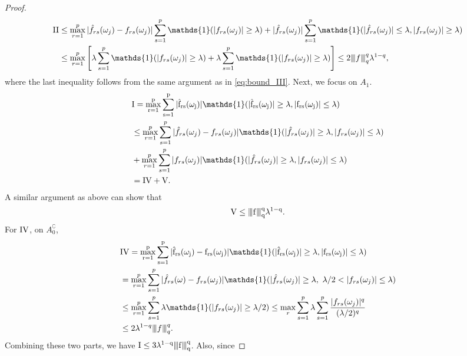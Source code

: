\begin{proof}
\begin{equation*}
\begin{aligned}
\rm{II} &\le \max_{r=1}^p |\hat{f}_{rs}(\omega_j)-f_{rs}(\omega_j)|\sum_{s=1}^p\mathds{1}(|f_{rs}(\omega_j)|\ge \lambda)+|\hat{f}_{rs}(\omega_j)|\sum_{s=1}^p \mathds{1}(|\hat{f}_{rs}(\omega_j)|\le \lambda, |f_{rs}(\omega_j)|\ge \lambda)\\
& \le \max_{r=1}^p \left[\lambda \sum_{s=1}^p\mathds{1}(|f_{rs}(\omega_j)|\ge \lambda)+\lambda  \sum_{s=1}^p \mathds{1}(|f_{rs}(\omega_j)|\ge \lambda)\right]\le 2\vertiii{f}_q^q \lambda^{1-q},
\end{aligned}
\end{equation*}
where the last inequality follows from the same argument as in \eqref{eq:bound_III}. Next, we focus on $A_1$. 
\begin{equation*}
\begin{aligned}
&\rm{I} = \max_{r=1}^p \sum_{s=1}^p |\hat{f}_{rs}(\omega_j)|\mathds{1}(|\hat{f}_{rs}(\omega_j)|\ge \lambda, |f_{rs}(\omega_j)|\le \lambda)\\
& \le \max_{r=1}^p \sum_{s=1}^p |\hat{f}_{rs}(\omega_j)-f_{rs}(\omega_j)|\mathds{1}(|\hat{f}_{rs}(\omega_j)|\ge \lambda, |f_{rs}(\omega_j)|\le \lambda)\\
&+\max_{r=1}^p \sum_{s=1}^p |f_{rs}(\omega_j)|\mathds{1}(|\hat{f}_{rs}(\omega_j)|\ge \lambda, |f_{rs}(\omega_j)|\le \lambda)\\
& = \rm{IV}+\rm{V}.
\end{aligned}
\end{equation*}
A similar argument as above can show that 
\begin{equation}
\rm{V}\le {\left\vert\kern-0.25ex\left\vert\kern-0.25ex\left\vert f \right\vert\kern-0.25ex\right\vert\kern-0.25ex\right\vert}_q^q \lambda^{1-q}. \nonumber
\end{equation}
For $\rm{IV}$, on $A_0^\complement$, 
\begin{equation*}
\begin{aligned}
&\rm{IV} = \max_{r=1}^p \sum_{s=1}^p |\hat{f}_{rs}(\omega_j)-f_{rs}(\omega_j)|\mathds{1}(|\hat{f}_{rs}(\omega_j)|\ge \lambda, |f_{rs}(\omega_j)|\le \lambda)\\
&= \max_{r=1}^p \sum_{s=1}^p |\hat{f}_{rs}(\omega)-f_{rs}(\omega_j)|
\mathds{1}(|\hat{f}_{rs}(\omega_j)|\ge \lambda, ~\lambda/2<|f_{rs}(\omega_j)|\le \lambda)\\
& \le \max_{r=1}^p \sum_{s=1}^p \lambda \mathds{1}(|f_{rs}(\omega_j)|\ge \lambda/2) \le \max_r \sum_{s=1}^p \lambda \sum_{s=1}^p \frac{|f_{rs}(\omega_j)|^q}{(\lambda/2)^q}\\
&\le 2\lambda^{1-q} \vertiii{f}_q^q. 
\end{aligned}
\end{equation*}
Combining these two parts, we have $\rm{I}\le 3\lambda^{1-q}{\left\vert\kern-0.25ex\left\vert\kern-0.25ex\left\vert f \right\vert\kern-0.25ex\right\vert\kern-0.25ex\right\vert}_q^q$. Also, since 

\end{proof}
